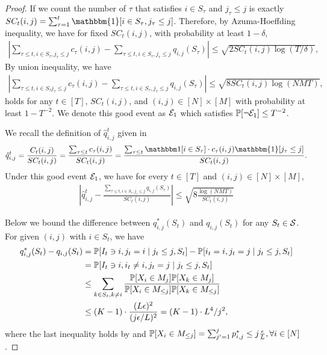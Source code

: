 \begin{lemma}
\begin{proof}
If we count the number of $\tau$ that satisfies $i \in S_\tau$ and $j_\tau \le j$ is exactly $SC_t(i,j) = \sum_{\tau=1}^t \mathbbm{1}[i \in S_\tau, j_\tau \le j]$. Therefore, by Azuma-Hoeffding inequality, we have for fixed $SC_t(i,j)$, with probability at least $1 - \delta$,
\begin{align*}
    \left|\sum_{\tau \le t, i \in S_\tau, j_\tau \le j} c_\tau(i, j) - \sum_{\tau \le t, i \in S_\tau, j_\tau \le j} q_{i,j}(S_\tau)\right| \le \sqrt{2SC_t(i,j)\log(T/\delta)},
\end{align*}
By union inequality, we have 
\begin{align*}
    \left|\sum_{\tau \le t, i \in S_\tau j_\tau \le j} c_\tau(i, j) - \sum_{\tau \le t, i \in S_\tau, j_\tau \le j} q_{i,j}(S_\tau)\right| \le \sqrt{8SC_t(i,j)\log(NMT)}, 
\end{align*}
holds for any $t\in [T]$, $SC_t(i,j)$, and $(i, j) \in [N] \times [M]$ with probability at least $1 - T^{-2}$. We denote this good event as ${\mathcal{E}}_1$ which satisfies ${\mathbb{P}}[\neg{\mathcal{E}}_1] \le T^{-2}$.

We recall the definition of $\hat q_{i,j}^t$ given in 
\begin{align*}
    \hat q_{i,j}^t = \frac{C_t(i,j)}{SC_t(i,j)} = \frac{\sum_{\tau \le t} c_{\tau}(i,j)}{SC_t(i,j)} = \frac{\sum_{\tau \le t} \1[i \in S_\tau]\cdot c_{\tau}(i,j)\mathbbm{1}[j_\tau \le j]}{SC_t(i,j)}.
\end{align*}
Under this good event ${\mathcal{E}}_1$, we have for every $t \in [T]$ and $(i, j) \in [N] \times [M]$,
\begin{align*}
    \left| \hat q_{i,j}^t - \frac{\sum_{\tau \le t, i \in S_\tau, j_\tau \le j} q_{i,j}(S_\tau)}{SC_t(i,j)}\right| \le \sqrt{8\frac{\log(NMT)}{SC_t(i,j)}}
\end{align*}

Below we bound the difference between $q^*_{i,j}(S_t)$ and $q_{i,j}(S_t)$ for any $S_t \in {\mathcal{S}}$. For given $(i, j)$ with $i \in S_t$, we have
\begin{align*}
    q^*_{i,j}(S_t) - q_{i,j}(S_t) &= {\mathbb{P}}[I_t \ni i, j_t = i \mid j_t \le j, S_t] - {\mathbb{P}}[i_t = i, j_t = j \mid j_t \le j, S_t] \\
    &= {\mathbb{P}}[I_t \ni i, i_t \neq i, j_t = j \mid j_t \le j, S_t] \\
    &\le \sum_{k \in S_t, k \neq i}\frac{{\mathbb{P}}[X_i \in M_j]{\mathbb{P}}[X_k \in M_j]}{{\mathbb{P}}[X_i \in M_{\le j}]{\mathbb{P}}[X_k \in M_{\le j}]} \\
    &\le (K-1)\cdot \frac{(L\epsilon)^2}{(j\epsilon/L)^2} = (K-1)\cdot L^4/j^2,
\end{align*}
where the last inequality holds by  and ${\mathbb{P}}[X_i \in M_{\le j}] = \sum_{j'=1}^j p_{i,j}^* \le j\frac{\epsilon}{L}, \forall i \in [N]$. 


\end{proof}
\end{lemma}
